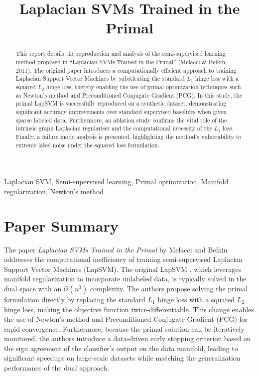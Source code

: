 \documentclass[conference]{IEEEtran}
\begin{document}
\title{Laplacian SVMs Trained in the Primal}

\author{
}

\maketitle

\begin{abstract}
This report details the reproduction and analysis of the semi-supervised learning method proposed in ``Laplacian SVMs Trained in the Primal'' (Melacci \& Belkin, 2011). The original paper introduces a computationally efficient approach to training Laplacian Support Vector Machines by substituting the standard $L_1$ hinge loss with a squared $L_2$ hinge loss, thereby enabling the use of primal optimization techniques such as Newton's method and Preconditioned Conjugate Gradient (PCG). In this study, the primal LapSVM is successfully reproduced on a synthetic dataset, demonstrating significant accuracy improvements over standard supervised baselines when given sparse labeled data. Furthermore, an ablation study confirms the vital role of the intrinsic graph Laplacian regulariser and the computational necessity of the $L_2$ loss. Finally, a failure mode analysis is presented, highlighting the method's vulnerability to extreme label noise under the squared loss formulation.
\end{abstract}

\begin{IEEEkeywords}
Laplacian SVM, Semi-supervised learning, Primal optimization, Manifold regularization, Newton's method
\end{IEEEkeywords}

\section{Paper Summary}
The paper \textit{Laplacian SVMs Trained in the Primal} by Melacci and Belkin \cite{melacci2011laplacian} addresses the computational inefficiency of training semi-supervised Laplacian Support Vector Machines (LapSVM). The original LapSVM \cite{belkin2006manifold}, which leverages manifold regularization to incorporate unlabeled data, is typically solved in the dual space with an $\mathcal{O}(n^3)$ complexity. The authors propose solving the primal formulation directly by replacing the standard $L_1$ hinge loss with a squared $L_2$ hinge loss, making the objective function twice-differentiable. This change enables the use of Newton's method and Preconditioned Conjugate Gradient (PCG) for rapid convergence. Furthermore, because the primal solution can be iteratively monitored, the authors introduce a data-driven early stopping criterion based on the sign agreement of the classifier's output on the data manifold, leading to significant speedups on large-scale datasets while matching the generalization performance of the dual approach.
\end{document}
